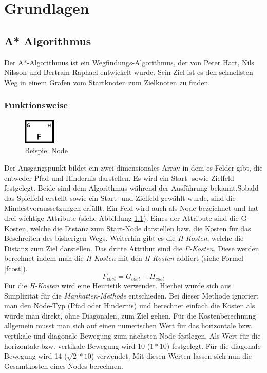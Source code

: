 \chapter{Grundlagen}
\label{sec:fundamentals}
\section{A* Algorithmus}
\label{sec:fundamentalsA*}
Der A*-Algorithmus ist ein Wegfindungs-Algorithmus, der von Peter Hart, Nils Nilsson und Bertram Raphael entwickelt wurde. Sein Ziel ist es den schnellsten Weg in einem Grafen vom Startknoten zum Zielknoten zu finden. 
\subsection{Funktionsweise}
\begin{figure}
    \includegraphics[width=1.5cm]{assets/aStarNode.png}
    \caption{Beispiel Node}
    \label{fig:aStarNode}
\end{figure}
Der Ausgangspunkt bildet ein zwei-dimensionales Array in dem es Felder gibt, die entweder Pfad und Hindernis darstellen. Es wird ein Start- sowie Zielfeld festgelegt. Beide sind dem Algorithmus während der Ausführung bekannt.Sobald das Spielfeld erstellt sowie ein Start- und Zielfeld gewählt wurde, sind die Mindestvoraussetzungen erfüllt. Ein Feld wird auch als Node bezeichnet und hat drei wichtige Attribute (siehe Abbildung \ref{fig:aStarNode}). Eines der Attribute sind die G-Kosten, welche die Distanz zum Start-Node darstellen bzw. die Kosten für das Beschreiten des bisherigen Wegs. Weiterhin gibt es die \textit{H-Kosten}, welche die Distanz zum Ziel darstellen. Das dritte Attribut sind die \textit{F-Kosten}. Diese werden berechnet indem man die \textit{H-Kosten} mit den \textit{H-Kosten} addiert (siehe Formel \ref{fcost}).
\begin{equation}
F_{cost} = G_{cost} + H_{cost}
\label{fcost}
\end{equation}
Für die \textit{H-Kosten} wird eine Heuristik verwendet. Hierbei wurde sich aus Simplizität für die \textit{Manhatten-Methode} entschieden. Bei dieser Methode ignoriert man den Node-Typ (Pfad oder Hindernis) und berechnet einfach die Kosten als würde man direkt, ohne Diagonalen, zum Ziel gehen. Für die Kostenberechnung allgemein musst man sich auf einen numerischen Wert für das horizontale bzw. vertikale und diagonale Bewegung zum nächsten Node festlegen. Als Wert für die horizontale bzw. vertikale Bewegung wird 10 ($1*10$) festgelegt. Für die diagonale Bewegung wird 14 ($\sqrt{2}*10$) verwendet. Mit diesen Werten lassen sich nun die Gesamtkosten eines Nodes berechnen.

